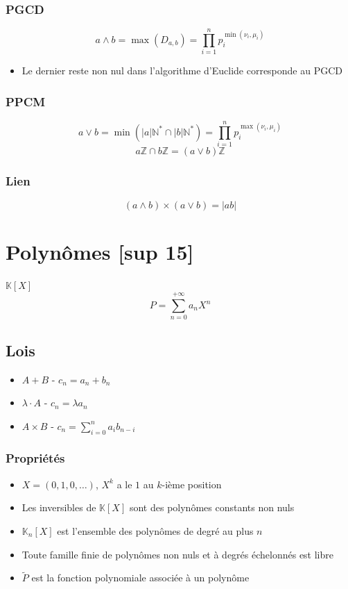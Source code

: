 \documentclass[openany]{book}
\begin{document}
\subsubsection{PGCD}
\[ a \wedge b = \max (D_{a, b}) = \prod_{i=1}^n p_i^{\min (\nu_i, \mu_i)} \]
\begin{itemize}
    \item Le dernier reste non nul dans l'algorithme d'Euclide corresponde au PGCD
\end{itemize}

\subsubsection{PPCM}
\[a \vee b = \min (|a|\mathbb{N}^* \cap |b|\mathbb{N}^*) = \prod_{i=1}^n p_i^{\max (\nu_i, \mu_i)}\]
\[ a \mathbb{Z} \cap b \mathbb{Z} = (a \vee b) \mathbb{Z} \]

\subsubsection{Lien}
\[ (a \wedge b) \times (a \vee b) = |ab| \]

\clearpage
\section{Polynômes [sup 15]}
$ \mathbb{K}[X] $
\[ P = \sum_{n=0}^{+\infty} a_n X^n \]

\subsection{Lois}
\begin{itemize}
    \item $A+B$ - $c_n = a_n + b_n$
    \item $\lambda \cdot A$ - $c_n = \lambda a_n$
    \item $A \times B$ - $ c_n = \sum_{i=0}^n a_i b_{n-i} $
\end{itemize}

\subsubsection{Propriétés}
\begin{itemize}
    \item $X = (0, 1, 0, \dots)$, $X^k$ a le $1$ au $k$-ième position
    \item Les inversibles de $\mathbb{K}[X]$ sont des polynômes constants non nuls
    \item $\mathbb{K}_n[X]$ est l'ensemble des polynômes de degré au plus $n$
    \item Toute famille finie de polynômes non nuls et à degrés échelonnés est libre
    \item $\tilde{P}$ est la fonction polynomiale associée à un polynôme
\end{itemize}
\end{document}
